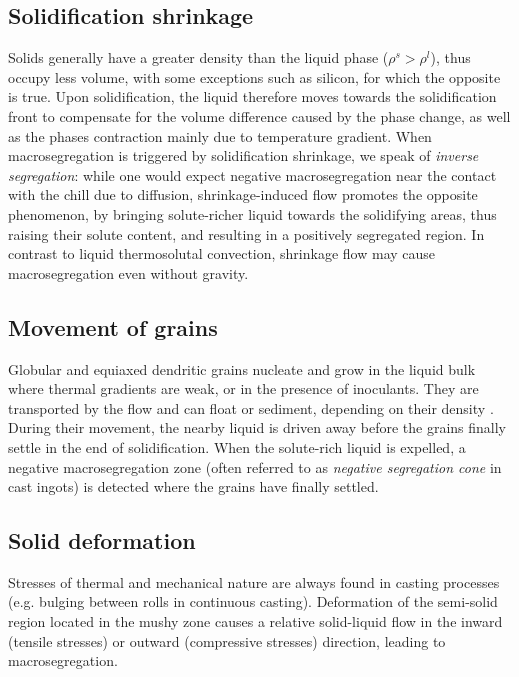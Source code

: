 \subsection{Solidification shrinkage}

Solids generally have a greater density than the liquid phase ($\rho^s > \rho^l$), 
thus occupy less volume, with some exceptions such as silicon, for which the opposite is true. 
Upon solidification, the liquid therefore moves towards the solidification front to compensate for the volume 
difference caused by the phase change, as well as the phases contraction mainly due to temperature gradient. When macrosegregation is 
triggered by solidification shrinkage, we speak of \emph{inverse segregation}: while one would expect 
negative macrosegregation near the contact with the chill due to diffusion, shrinkage-induced flow 
promotes the opposite phenomenon, by bringing solute-richer liquid towards the solidifying areas, thus raising 
their solute content, and resulting in a positively segregated region.
In contrast to liquid thermosolutal convection, shrinkage flow may cause macrosegregation even without gravity.
%
%

\subsection{Movement of grains}

Globular and equiaxed dendritic grains nucleate and grow in the liquid bulk where thermal gradients 
are weak, or in the presence of inoculants. They are transported by the flow and can float 
or sediment, depending on their density \citep{beckermann_modelling_2002}. During their movement, the nearby 
liquid is driven away before the grains finally settle in the end of solidification. When the solute-rich liquid
is expelled, a negative macrosegregation zone (often referred to as \emph{negative segregation cone} in cast ingots) 
is detected where the grains have finally settled.
%
%

\subsection{Solid deformation} 

Stresses of thermal and mechanical nature are always found in casting processes 
(e.g. bulging between rolls in continuous casting). 
Deformation of the semi-solid region located in the mushy zone causes a relative solid-liquid 
flow in the inward (tensile stresses) or outward (compressive stresses) direction, leading to macrosegregation.
%


